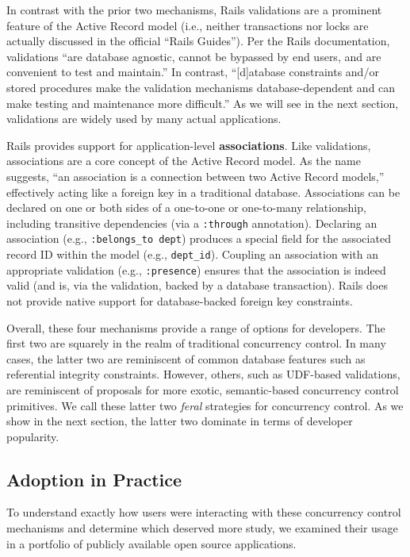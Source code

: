 \begin{myenumerate}
In contrast with the prior two mechanisms, Rails validations are a
prominent feature of the Active Record model (i.e., neither
transactions nor locks are actually discussed in the official ``Rails
Guides''). Per the Rails documentation, validations ``are database
agnostic, cannot be bypassed by end users, and are convenient to test
and maintain.'' In contrast, ``[d]atabase constraints and/or stored procedures make the
validation mechanisms database-dependent and can make testing and
maintenance more difficult.'' As we will see in the next section,
validations are widely used by many actual applications.

\item Rails provides support for application-level
\textbf{associations}. Like validations, associations are a core
concept of the Active Record model. As the name suggests, ``an
association is a connection between two Active Record models,''
effectively acting like a foreign key in a traditional
database. Associations can be declared on one or both sides of a
one-to-one or one-to-many relationship, including transitive
dependencies (via a \texttt{:through} annotation). Declaring an
association (e.g., \texttt{:belongs\_to dept}) produces a special field
for the associated record ID within the model (e.g.,
\texttt{dept\_id}). Coupling an association with an appropriate
validation (e.g., \texttt{:presence}) ensures that the association is
indeed valid (and is, via the validation, backed by a database
transaction). Rails does not provide native support for
database-backed foreign key constraints.
\end{myenumerate}

Overall, these four mechanisms provide a range of options for
developers. The first two are squarely in the realm of traditional
concurrency control. In many cases, the latter two are reminiscent of
common database features such as referential
integrity constraints. However, others, such as UDF-based validations,
are reminiscent of proposals for more exotic, semantic-based
concurrency control primitives. We call these latter two
\textit{feral} strategies for concurrency control. As we show in the next section, the
latter two dominate in terms of developer popularity.

\subsection{Adoption in Practice}

To understand exactly how users were interacting with these
concurrency control mechanisms and determine which deserved more
study, we examined their usage in a portfolio of publicly available
open source applications.


